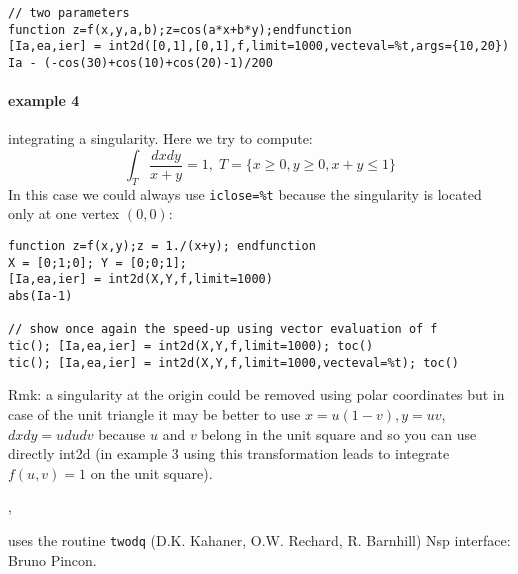 \begin{examples}
\begin{Verbatim}
// two parameters
function z=f(x,y,a,b);z=cos(a*x+b*y);endfunction
[Ia,ea,ier] = int2d([0,1],[0,1],f,limit=1000,vecteval=%t,args={10,20})
Ia - (-cos(30)+cos(10)+cos(20)-1)/200
\end{Verbatim}

\paragraph{example 4} integrating a singularity. Here we try to compute:
$$
    \int_T \frac{dxdy}{x+y} = 1, \; T = \{ x \ge 0, y \ge 0, x+y \le 1 \}
$$ 
In this case we could always use \verb+iclose=%t+ because the singularity is
located only at one vertex $(0,0)$:
\begin{Verbatim}
function z=f(x,y);z = 1./(x+y); endfunction
X = [0;1;0]; Y = [0;0;1];
[Ia,ea,ier] = int2d(X,Y,f,limit=1000)
abs(Ia-1)

// show once again the speed-up using vector evaluation of f
tic(); [Ia,ea,ier] = int2d(X,Y,f,limit=1000); toc()
tic(); [Ia,ea,ier] = int2d(X,Y,f,limit=1000,vecteval=%t); toc()
\end{Verbatim}
Rmk: a singularity at the origin could be removed using polar
coordinates but in case of the unit triangle it may be better
to use $x = u(1-v), y = uv$, $dxdy = u dudv$ because $u$ and $v$
belong in the unit square and so you can use directly int2d
(in example 3 using this transformation leads to integrate $f(u,v)=1$
on the unit square). 
\end{examples}

\begin{manseealso}
  ,   
\end{manseealso}

\begin{authors}
  uses the routine \verb!twodq! (D.K. Kahaner, O.W. Rechard, R. Barnhill)
  Nsp interface: Bruno Pincon.
\end{authors}
